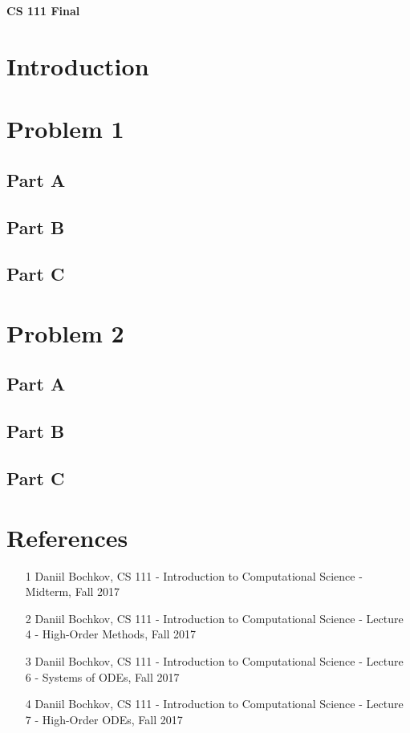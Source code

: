 \documentclass[12pt]{article}
\begin{document}
\centerline{\Large\textbf{CS 111 Final}}
\vspace{.5cm}

\section*{Introduction}\label{sec::Intro}
\section*{Problem 1}\label{sec::Problem1}
\subsection*{Part A}
\subsection*{Part B}
\subsection*{Part C}

\section*{Problem 2}\label{sec::Problem2}
\subsection*{Part A}
\subsection*{Part B}
\subsection*{Part C}

\newpage
\clearpage
\setcounter{page}{1} \pagestyle{empty}
\section*{References}\label{sec::References}
\begin{itemize}
\item [1] Daniil Bochkov, CS 111 - Introduction to Computational Science - Midterm, Fall 2017
\item [2] Daniil Bochkov, CS 111 - Introduction to Computational Science - Lecture 4 - High-Order Methods, Fall 2017
\item [3] Daniil Bochkov, CS 111 - Introduction to Computational Science - Lecture 6 - Systems of ODEs,  Fall 2017
\item [4] Daniil Bochkov, CS 111 - Introduction to Computational Science - Lecture 7 - High-Order ODEs, Fall 2017
\end{itemize}
\end{document}
